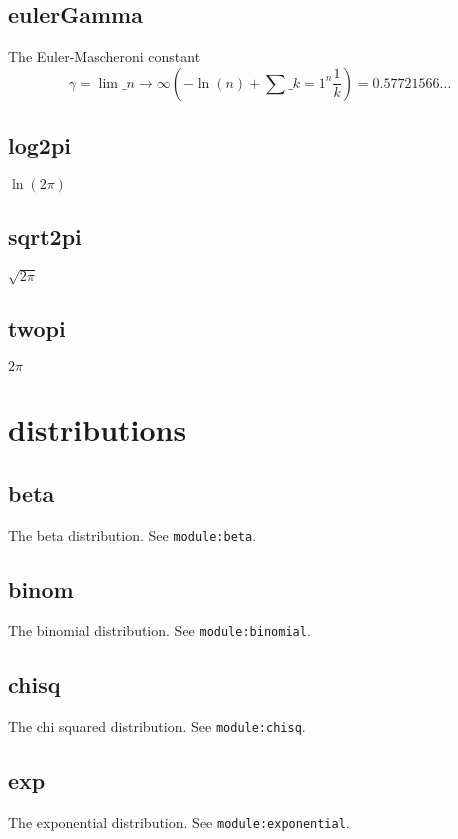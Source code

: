 \documentclass{article}
\begin{document}
    \subsection*{eulerGamma}
    The Euler-Mascheroni constant
\[\gamma = \lim \_ {n \to \infty} \left(-\ln(n) + \sum \_ {k=1}^n \frac{1}{k}\right) = 0.57721566 \ldots\]


    \subsection*{log2pi}
    $\ln(2\pi)$


    \subsection*{sqrt2pi}
    $\sqrt{2\pi}$


    \subsection*{twopi}
    $2\pi$


  \section{distributions}
    \subsection*{beta}
    The beta distribution. See \texttt{module:beta}.


    \subsection*{binom}
    The binomial distribution. See \texttt{module:binomial}.


    \subsection*{chisq}
    The chi squared distribution. See \texttt{module:chisq}.


    \subsection*{exp}
    The exponential distribution. See \texttt{module:exponential}.
\end{document}
